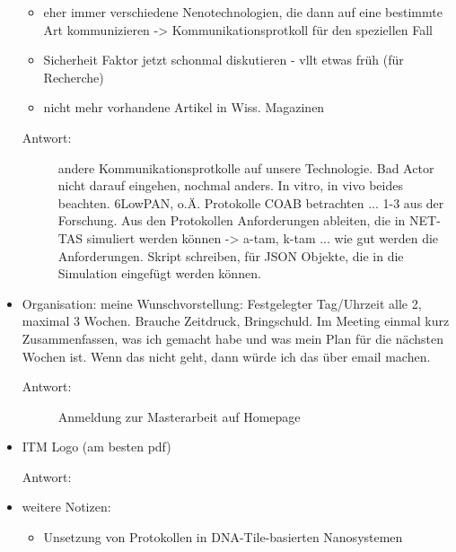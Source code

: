 \begin{itemize}
\begin{itemize}
    \item eher immer verschiedene Nenotechnologien, die dann auf eine bestimmte Art kommunizieren -> Kommunikationsprotkoll für den speziellen Fall
    \item Sicherheit Faktor jetzt schonmal diskutieren - vllt etwas früh (für Recherche)
    \item nicht mehr vorhandene Artikel in Wiss. Magazinen
  \end{itemize}
  \begin{description}
    \item[Antwort: ] andere Kommunikationsprotkolle auf unsere Technologie. Bad Actor nicht darauf eingehen, nochmal anders. In vitro, in vivo beides beachten. 6LowPAN, o.Ä. Protokolle COAB betrachten ... 1-3 aus der Forschung. Aus den Protokollen Anforderungen ableiten, die in NET-TAS simuliert werden können -> a-tam, k-tam ... wie gut werden die Anforderungen. Skript schreiben, für JSON Objekte, die in die Simulation eingefügt werden können.
  \end{description}
  \item Organisation: meine Wunschvorstellung: Festgelegter Tag/Uhrzeit alle 2, maximal 3 Wochen. Brauche Zeitdruck, Bringschuld. Im Meeting einmal kurz Zusammenfassen, was ich gemacht habe und was mein Plan für die nächsten Wochen ist. Wenn das nicht geht, dann würde ich das über email machen.
  \begin{description}
    \item[Antwort: ] Anmeldung zur Masterarbeit auf Homepage
  \end{description}
  \item ITM Logo (am besten pdf)
  \begin{description}
    \item[Antwort: ]
  \end{description}
  \item weitere Notizen:
  \begin{itemize}
    \item Unsetzung von Protokollen in DNA-Tile-basierten Nanosystemen
  \end{itemize}
\end{itemize}


